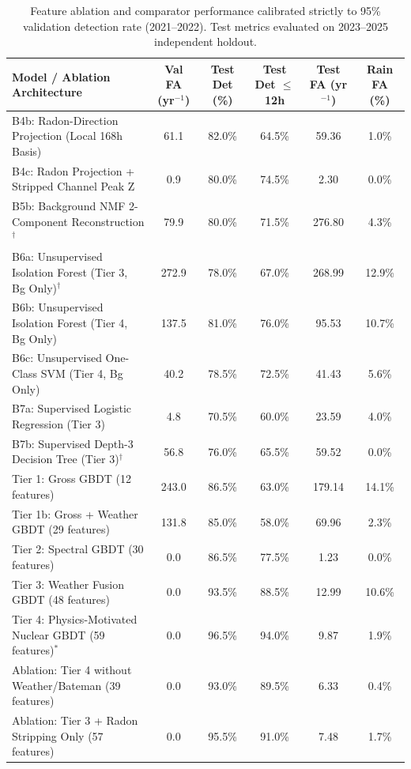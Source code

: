 \begin{table}[H]
\caption{Feature ablation and comparator performance calibrated strictly to 95\% validation detection rate (2021--2022). Test metrics evaluated on 2023--2025 independent holdout.}
\label{tab:ablation_summary}
\centering
\small
\begin{tabularx}{\textwidth}{@{}X c c c c c@{}}
\toprule
\textbf{Model / Ablation Architecture} & \textbf{Val FA (yr$^{-1}$)} & \textbf{Test Det (\%)} & \textbf{Test Det $\le$ 12h} & \textbf{Test FA (yr$^{-1}$)} & \textbf{Rain FA (\%)} \\
\midrule
B4b: Radon-Direction Projection (Local 168h Basis) & 61.1 & 82.0\% & 64.5\% & 59.36 & 1.0\% \\
B4c: Radon Projection + Stripped Channel Peak Z & 0.9 & 80.0\% & 74.5\% & 2.30 & 0.0\% \\
B5b: Background NMF 2-Component Reconstruction$^\dagger$ & 79.9 & 80.0\% & 71.5\% & 276.80 & 4.3\% \\
B6a: Unsupervised Isolation Forest (Tier 3, Bg Only)$^\dagger$ & 272.9 & 78.0\% & 67.0\% & 268.99 & 12.9\% \\
B6b: Unsupervised Isolation Forest (Tier 4, Bg Only) & 137.5 & 81.0\% & 76.0\% & 95.53 & 10.7\% \\
B6c: Unsupervised One-Class SVM (Tier 4, Bg Only) & 40.2 & 78.5\% & 72.5\% & 41.43 & 5.6\% \\
B7a: Supervised Logistic Regression (Tier 3) & 4.8 & 70.5\% & 60.0\% & 23.59 & 4.0\% \\
B7b: Supervised Depth-3 Decision Tree (Tier 3)$^\dagger$ & 56.8 & 76.0\% & 65.5\% & 59.52 & 0.0\% \\
Tier 1: Gross GBDT (12 features) & 243.0 & 86.5\% & 63.0\% & 179.14 & 14.1\% \\
Tier 1b: Gross + Weather GBDT (29 features) & 131.8 & 85.0\% & 58.0\% & 69.96 & 2.3\% \\
Tier 2: Spectral GBDT (30 features) & 0.0 & 86.5\% & 77.5\% & 1.23 & 0.0\% \\
Tier 3: Weather Fusion GBDT (48 features) & 0.0 & 93.5\% & 88.5\% & 12.99 & 10.6\% \\
Tier 4: Physics-Motivated Nuclear GBDT (59 features)$^*$ & 0.0 & 96.5\% & 94.0\% & 9.87 & 1.9\% \\
Ablation: Tier 4 without Weather/Bateman (39 features) & 0.0 & 93.0\% & 89.5\% & 6.33 & 0.4\% \\
Ablation: Tier 3 + Radon Stripping Only (57 features) & 0.0 & 95.5\% & 91.0\% & 7.48 & 1.7\% \\

\end{tabularx}
\end{table}
